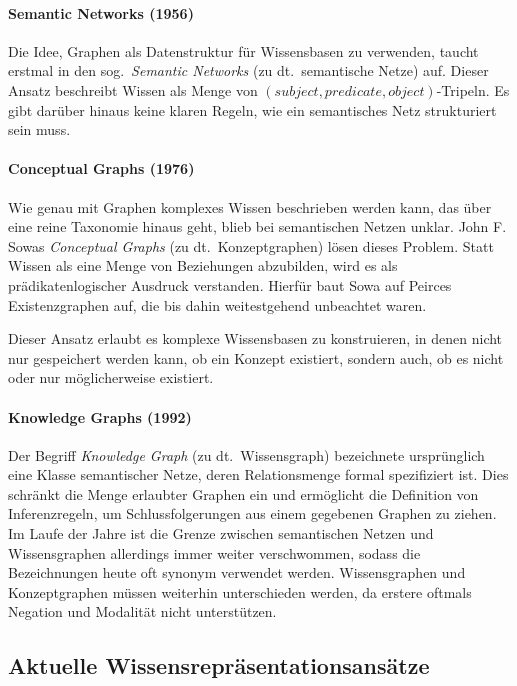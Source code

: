 \paragraph{Semantic Networks (1956)}
Die Idee, Graphen als Datenstruktur für Wissensbasen zu verwenden, taucht erstmal in den sog.~\textit{Semantic Networks} (zu dt.~semantische Netze) auf.
Dieser Ansatz beschreibt Wissen als Menge von $(subject, predicate, object)$-Tripeln.
Es gibt darüber hinaus keine klaren Regeln, wie ein semantisches Netz strukturiert sein muss.

\paragraph{Conceptual Graphs (1976)}
Wie genau mit Graphen komplexes Wissen beschrieben werden kann, das über eine reine Taxonomie hinaus geht, blieb bei semantischen Netzen unklar.
John F. Sowas \textit{Conceptual Graphs} (zu dt.~Konzeptgraphen) lösen dieses Problem.
Statt Wissen als eine Menge von Beziehungen abzubilden, wird es als prädikatenlogischer Ausdruck verstanden.
Hierfür baut Sowa auf Peirces Existenzgraphen auf, die bis dahin weitestgehend unbeachtet waren.

Dieser Ansatz erlaubt es komplexe Wissensbasen zu konstruieren, in denen nicht nur gespeichert werden kann, ob ein Konzept existiert, sondern auch, ob es nicht oder nur möglicherweise existiert.

\paragraph{Knowledge Graphs (1992)}
Der Begriff \textit{Knowledge Graph} (zu dt.~Wissensgraph) bezeichnete ursprünglich eine Klasse semantischer Netze, deren Relationsmenge formal spezifiziert ist.
Dies schränkt die Menge erlaubter Graphen ein und ermöglicht die Definition von Inferenzregeln, um Schlussfolgerungen aus einem gegebenen Graphen zu ziehen.
Im Laufe der Jahre ist die Grenze zwischen semantischen Netzen und Wissensgraphen allerdings immer weiter verschwommen, sodass die Bezeichnungen heute oft synonym verwendet werden.
Wissensgraphen und Konzeptgraphen müssen weiterhin unterschieden werden, da erstere oftmals Negation und Modalität nicht unterstützen.

\subsection{Aktuelle Wissensrepräsentationsansätze}
\label{sec:related:kr:today}

